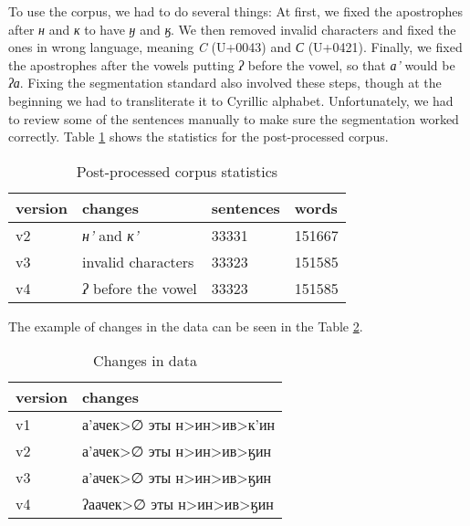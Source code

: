 \documentclass[leqno]{article}
\begin{document}
To use the corpus, we had to do several things: At first, we fixed the apostrophes after
\textit{н} and \textit{к} to have \textit{ӈ} and \textit{ӄ}. We then removed invalid characters and fixed the ones in wrong language, meaning \textit{C} (U+0043) and
\textit{С} (U+0421). Finally, we fixed the apostrophes after the vowels putting \textit{ʔ}
before the vowel, so that \textit{а’} would be \textit{ʔа}. Fixing the segmentation standard also involved these steps, though at the beginning we had to transliterate it to Cyrillic alphabet. Unfortunately, we had to review some of the sentences manually to make sure the segmentation worked correctly. Table \ref{tab:postproc} shows the statistics for the post-processed corpus.
\begin{table}[h]
\centering
\begin{tabular}{|l|l|l|l|}
\hline
{\color[HTML]{000000} version} & {\color[HTML]{000000} changes}              & {\color[HTML]{000000} sentences} & {\color[HTML]{000000} words}  \\ \hline
{\color[HTML]{000000} v2}      & {\color[HTML]{000000} \textit{н'} and \textit{к'}}          & {\color[HTML]{000000} 33331}     & {\color[HTML]{000000} 151667} \\ \hline
{\color[HTML]{000000} v3}      & {\color[HTML]{000000} invalid characters}   & {\color[HTML]{000000} 33323}     & {\color[HTML]{000000} 151585} \\ \hline
{\color[HTML]{000000} v4}      & {\color[HTML]{000000} \textit{ʔ} before the vowel} & {\color[HTML]{000000} 33323}     & {\color[HTML]{000000} 151585} \\ \hline
\end{tabular}
\caption{Post-processed corpus statistics}
\label{tab:postproc}
\end{table}

The example of changes in the data can be seen in the Table \ref{tab:datachanges}.

\begin{table}[h]
\centering
\begin{tabular}{|l|l|}
\hline
{\color[HTML]{000000} version} & {\color[HTML]{000000} changes}       \\ \hline
{\color[HTML]{000000} v1}      & {\color[HTML]{000000} а'ачек>∅ эты н>ин>ив>к'ин} \\ \hline
{\color[HTML]{000000} v2}      & {\color[HTML]{000000} а'ачек>∅ эты н>ин>ив>ӄин} \\ \hline
{\color[HTML]{000000} v3}      & {\color[HTML]{000000} а'ачек>∅ эты н>ин>ив>ӄин} \\ \hline
{\color[HTML]{000000} v4}      & {\color[HTML]{000000} ʔаачек>∅ эты н>ин>ив>ӄин} \\ \hline
\end{tabular}
\caption{Changes in data}
\label{tab:datachanges}
\end{table}
\end{document}
